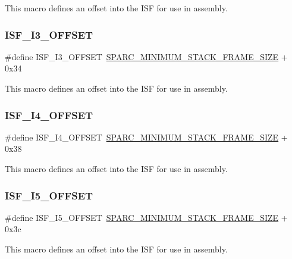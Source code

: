 This macro defines an offset into the I\+SF for use in assembly. \mbox{\label{group__RTEMSScoreCPUSPARC_ga172f4db05c181f867781d188c56856b0}} 
\subsubsection{\texorpdfstring{ISF\_I3\_OFFSET}{ISF\_I3\_OFFSET}}
{\footnotesize\ttfamily \#define I\+S\+F\+\_\+\+I3\+\_\+\+O\+F\+F\+S\+ET~\mbox{\hyperlink{group__RTEMSScoreCPUSPARC_ga8e296685f05588131b26bdc695cb9b8c}{S\+P\+A\+R\+C\+\_\+\+M\+I\+N\+I\+M\+U\+M\+\_\+\+S\+T\+A\+C\+K\+\_\+\+F\+R\+A\+M\+E\+\_\+\+S\+I\+ZE}} + 0x34}

This macro defines an offset into the I\+SF for use in assembly. \mbox{\label{group__RTEMSScoreCPUSPARC_ga330fc497aa2d97a8710bbd9ae8e293cd}} 
\subsubsection{\texorpdfstring{ISF\_I4\_OFFSET}{ISF\_I4\_OFFSET}}
{\footnotesize\ttfamily \#define I\+S\+F\+\_\+\+I4\+\_\+\+O\+F\+F\+S\+ET~\mbox{\hyperlink{group__RTEMSScoreCPUSPARC_ga8e296685f05588131b26bdc695cb9b8c}{S\+P\+A\+R\+C\+\_\+\+M\+I\+N\+I\+M\+U\+M\+\_\+\+S\+T\+A\+C\+K\+\_\+\+F\+R\+A\+M\+E\+\_\+\+S\+I\+ZE}} + 0x38}

This macro defines an offset into the I\+SF for use in assembly. \mbox{\label{group__RTEMSScoreCPUSPARC_gac5e327b8d3e2952900125780c27d462c}} 
\subsubsection{\texorpdfstring{ISF\_I5\_OFFSET}{ISF\_I5\_OFFSET}}
{\footnotesize\ttfamily \#define I\+S\+F\+\_\+\+I5\+\_\+\+O\+F\+F\+S\+ET~\mbox{\hyperlink{group__RTEMSScoreCPUSPARC_ga8e296685f05588131b26bdc695cb9b8c}{S\+P\+A\+R\+C\+\_\+\+M\+I\+N\+I\+M\+U\+M\+\_\+\+S\+T\+A\+C\+K\+\_\+\+F\+R\+A\+M\+E\+\_\+\+S\+I\+ZE}} + 0x3c}

This macro defines an offset into the I\+SF for use in assembly. \mbox{\label{group__RTEMSScoreCPUSPARC_gaf5a868390e8bb7d39bfe76933d7814dc}} 
